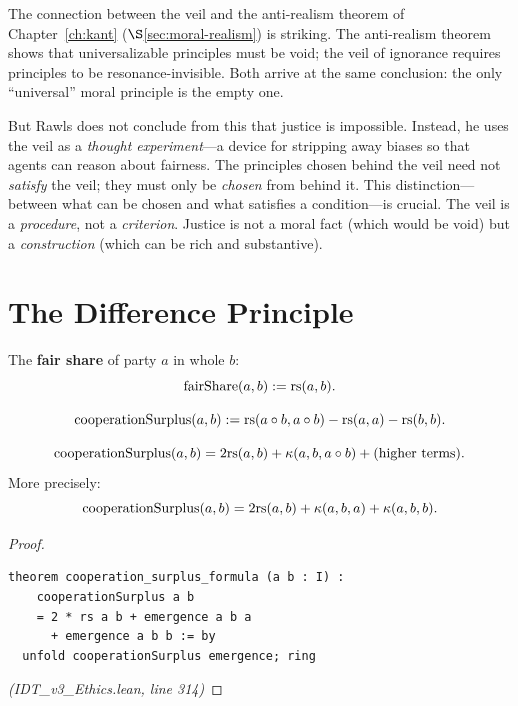 \begin{interpretation}
The connection between the veil and the anti-realism theorem of
Chapter~\ref{ch:kant} ($\S$\ref{sec:moral-realism}) is striking. The
anti-realism theorem shows that universalizable principles must be void;
the veil of ignorance requires principles to be resonance-invisible. Both
arrive at the same conclusion: the only ``universal'' moral principle is
the empty one.

But Rawls does not conclude from this that justice is impossible. Instead,
he uses the veil as a \emph{thought experiment}---a device for stripping
away biases so that agents can reason about fairness. The principles chosen
behind the veil need not \emph{satisfy} the veil; they must only be
\emph{chosen} from behind it. This distinction---between what can be
chosen and what satisfies a condition---is crucial. The veil is a
\emph{procedure}, not a \emph{criterion}. Justice is not a moral fact
(which would be void) but a \emph{construction} (which can be rich and
substantive).
\end{interpretation}

\section{The Difference Principle}

\begin{definition}
\label{def:fair-share}
The \textbf{fair share} of party $a$ in whole $b$:
\[
  \mathrm{fairShare}(a, b) := \mathrm{rs}(a, b).
\]
\end{definition}

\begin{definition}
\label{def:cooperation-surplus}
\[
  \mathrm{cooperationSurplus}(a, b) := \mathrm{rs}(a \circ b, a \circ b) - \mathrm{rs}(a, a) - \mathrm{rs}(b, b).
\]
\end{definition}

\begin{theorem}
\label{thm:cooperation-surplus}
\[
  \mathrm{cooperationSurplus}(a, b) = 2\mathrm{rs}(a, b) + \kappa(a, b, a \circ b) + \text{(higher terms)}.
\]
More precisely:
\[
  \mathrm{cooperationSurplus}(a, b) = 2\mathrm{rs}(a,b) + \kappa(a,b,a) + \kappa(a,b,b).
\]
\end{theorem}

\begin{proof}
\begin{lstlisting}
theorem cooperation_surplus_formula (a b : I) :
    cooperationSurplus a b
    = 2 * rs a b + emergence a b a
      + emergence a b b := by
  unfold cooperationSurplus emergence; ring
\end{lstlisting}
\textit{(IDT\_v3\_Ethics.lean, line 314)}
\end{proof}

